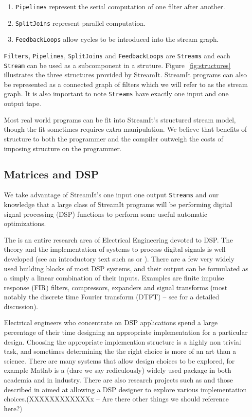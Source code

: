 \begin{enumerate}
\item {\tt Pipelines} represent the serial computation of one filter after another.
\item {\tt SplitJoins} represent parallel computation. 
\item {\tt FeedbackLoops} allow cycles to be introduced into the stream graph. 
\end{enumerate}

{\tt Filters}, {\tt Pipelines}, {\tt SplitJoins} and {\tt FeedbackLoops} 
are {\tt Streams} and each {\tt Stream} can be used as a subcomponent in 
a struture. Figure~\ref{fig:structures} illustrates the three structures provided by StreamIt.
StreamIt programs can also be represented as a connected graph of filters 
which we will refer to as the stream graph. It is also important to note
{\tt Streams} have exactly one input and one output tape.

Most real world programs can be fit into StreamIt's structured stream model, 
though the fit sometimes requires extra manipulation. We believe
that benefits of structure to both the programmer and the compiler outweigh the
costs of imposing structure on the programmer.

\subsection{Matrices and DSP}
We take advantage of StreamIt's one input one output {\tt Streams} and 
our knowledge that a large class of StreamIt programs will be performing
digital signal processing (DSP) functions to perform some useful automatic 
optimizations.

The is an entire research area of Electrical Engineering devoted to DSP. The
theory and the implementation of systems to process digital signals is well developed (see
an introductory text such as\cite{oppenheim-discrete} or \cite{lyons-understanding}). 
There are a few very widely used building blocks of most DSP systems, and their output 
can be formulated as a simply a linear combination of their inputs. Examples are
finite impulse response (FIR) filters, compressors, expanders and signal transforms
(most notably the discrete time Fourier transform (DTFT) -- 
see \cite{oppenheim-discrete} for a detailed discussion).

Electrical engineers who concentrate on DSP applications spend a large percentage of their 
time designing an appropriate implementation for a particular design. Choosing
the appropriate implemention structure is a highly non trivial task, and sometimes determining the 
the right choice is more of an art than a science. There are many systems that allow design choices
to be explored, for example Matlab\cite{matlab} is a (dare we say rediculously) widely used package 
in both academia and in industry. There are also research projects such as \cite{covell-ade} 
and those described in \cite{oppenheim-symbolic} aimed at allowing a DSP designer to explore
various implementation choices.(XXXXXXXXXXXXx -- Are there other things we should reference here?) 

